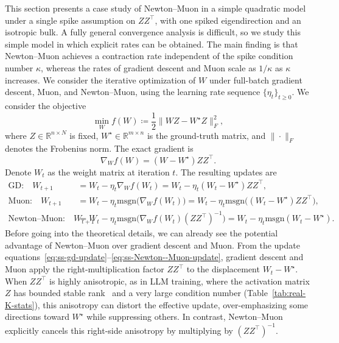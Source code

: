 \documentclass[11pt]{article}
\newcommand{\R}{\mathbb{R}}
\begin{document}
This section presents a case study of Newton--Muon in a simple quadratic model under a single spike assumption on ${Z}{Z}^\top$, with one spiked eigendirection and an isotropic bulk. A fully general convergence analysis is difficult, so we study this simple model in which explicit rates can be obtained. The main finding is that Newton--Muon achieves a contraction rate independent of the spike condition number $\kappa$, whereas the rates of gradient descent and Muon scale as $1/\kappa$ as $\kappa$ increases. We consider the iterative optimization of ${W}$ under full-batch gradient descent, Muon, and Newton--Muon, using the learning rate sequence $\{\eta_t\}_{t\ge 0}$. We consider the objective
\[
  \min_W f({W}) \coloneqq \frac12 \|{W}Z-W^\star{Z}\|_F^2,
\]
where ${Z}\in\R^{n\times N}$ is fixed, $W^\star\in\R^{m\times n}$ is the ground-truth matrix, and $\|\cdot\|_F$ denotes the Frobenius norm. The exact gradient is
\begin{equation}
  \label{eq:ss-grad}
  \nabla_{{W}} f({W}) = ({W}-W^\star){Z}{Z}^\top.
\end{equation}
Denote $W_t$ as the weight matrix at iteration $t$. The resulting updates are
\begin{align}
  \label{eq:ss-gd-update}
  \text{GD:}\quad
  W_{t+1}
  &=
  W_t-\eta_t \nabla_{W} f(W_t)
  =
  W_t-\eta_t ( W_t-W^\star )ZZ^\top, \\
  \label{eq:ss-muon-update}
  \text{Muon:}\quad
  W_{t+1}
  &=
  W_t-\eta_t \mathrm{msgn}\big(\nabla_{W} f(W_t)\big)
  =
  W_t-\eta_t \mathrm{msgn}\big(( W_t-W^\star )ZZ^\top\big), \\
  \label{eq:ss-Newton--Muon-update}
  \text{Newton--Muon:}\quad
  W_{t+1}
  &=
  W_t-\eta_t \mathrm{msgn}\big(\nabla_{W} f(W_t)(ZZ^\top)^{-1}\big)
  =
  W_t-\eta_t \mathrm{msgn}(W_t-W^\star).
\end{align}
Before going into the theoretical details, we can already see the potential advantage of Newton--Muon over gradient descent and Muon. From the update equations~\eqref{eq:ss-gd-update}--\eqref{eq:ss-Newton--Muon-update}, gradient descent and Muon apply the right-multiplication factor $ZZ^\top$ to the displacement $W_t-W^\star$. When $ZZ^\top$ is highly anisotropic, as in LLM training, where the activation matrix $Z$ has bounded stable rank~\citep{davis2025spectral} and a very large condition number (Table~\ref{tab:real-K-stats}), this anisotropy can distort the effective update, over-emphasizing some directions toward $W^\star$ while suppressing others. In contrast, Newton--Muon explicitly cancels this right-side anisotropy by multiplying by $(ZZ^\top)^{-1}$.
\end{document}
